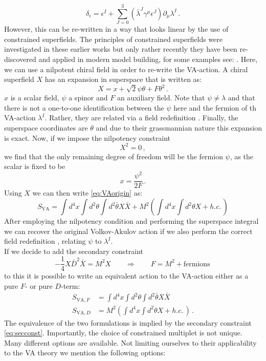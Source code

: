 \documentclass[12pt]{report}
\newcommand{\be}{\begin{equation}}
\newcommand{\ee}{\end{equation}}
\newcommand{\bea}{\begin{equation}\begin{aligned}}
\newcommand{\eea}{\end{aligned}\end{equation}}
\begin{document}
\be 
\delta_\epsilon = \epsilon^I + \sum_{J=0}^3 \left(\bar{\lambda}^J \gamma^\mu \epsilon^J\right) \partial_\mu \lambda^I\,.
\ee
However, this can be re-written in a way that looks linear by the use of constrained superfields\cite{Rocek:1978nb,Lindstrom:1979kq,Samuel:1982uh,Komargodski:2009rz}. The principles of constrained superfields were investigated in these earlier works but only rather recently they have been re-discovered and applied in modern model building, for some examples see: \cite{Kallosh:2016aep,Vercnocke:2016fbt,GarciadelMoral:2017vnz,Kallosh:2018nrk,Kallosh:2019apq,Cribiori:2019hod,Cribiori:2019bfx,Kallosh:2019zgd,Cribiori:2020zoh,Cribiori:2020bgt}. Here, we can use a nilpotent chiral field in order to re-write the VA-action. A chiral superfield $X$ has an expansion in superspace that is written as:
\be 
X = x + \sqrt{2} \psi \theta + F \theta^2\,.
\ee
$x$ is a scalar field, $\psi$ a spinor and $F$ an auxiliary field. Note that $\psi \neq \lambda$ and that there is not a one-to-one identification between the $\psi$ here and the fermion of th VA-action $\lambda^I$. Rather, they are related via a field redefinition \cite{Bergshoeff:2015jxa}. Finally, the superspace coordinates are $\theta$ and due to their grassmannian nature this expansion is exact. Now, if we impose the nilpotency constraint
\be 
X^2 = 0\,,
\ee
we find that the only remaining degree of freedom will be the fermion $\psi$, as the scalar is fixed to be 
\be 
x = \frac{\psi^2}{2 F}\,.
\ee 
Using $X$ we can then write \eqref{eq:VAorigin} as:
\be 
S_{\text{VA}} = \int d^4x \int d^2 \theta \int d^2 \bar{\theta} X \bar{X} + M^2 \left( \int d^4 x \int d^2\theta X + h.c.\,\right)
\ee
After employing the nilpotency condition and performing the superspace integral we can recover the original Volkov-Akulov action if we also perform the correct field redefinition \cite{Bergshoeff:2015jxa}, relating $\psi$ to $\lambda^I$.\\
If we decide to add the secondary constraint 
\be 
-\frac{1}{4} X \bar{D}^2 \bar{X} = M^2 X \qquad \Rightarrow \qquad F = M^2 + \text{fermions}\,
\label{eq:secconst}
\ee
to this it is possible to write an equivalent action to the VA-action either as a pure $F$- or pure $D$-term:
\bea 
S_{\text{VA},F} &= \int d^4x \int d^2 \theta \int d^2 \bar{\theta} X \bar{X} \\
S_{\text{VA},D} &=  M^2 \left( \int d^4 x \int d^2\theta X + h.c.\,\right)\,.
\eea
The equivalence of the two formulations is implied by the secondary constraint \eqref{eq:secconst}.
Importantly, the choice of constrained multiplet is not unique. Many different options are available\cite{Bandos:2016xyu,GarciadelMoral:2017vnz}. Not limiting ourselves to their applicability to the VA theory we mention the following options:
\end{document}
